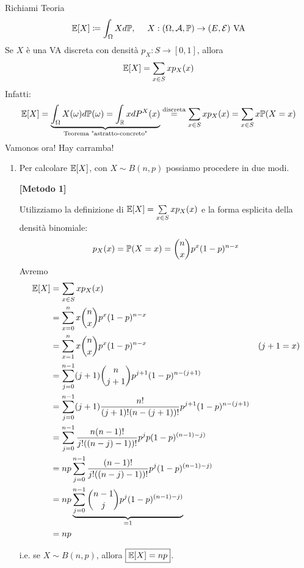 Richiami Teoria
\begin{equation*}
\mathbb{E}[ X] \coloneqq \int _{\Omega } Xd\mathbb{P} ,\ \ \ \ X:( \Omega ,\mathcal{A} ,\mathbb{P})\rightarrow ( E,\mathcal{E}) \ \text{VA}
\end{equation*}
Se $X$ è una VA discreta con densità $p_{X} :S\rightarrow [ 0,1]$, allora
\begin{equation*}
\mathbb{E}[ X] =\sum\limits _{x\in S} xp_{X}( x)
\end{equation*}
Infatti:
\begin{equation*}
\mathbb{E}[ X] =\underbrace{\int _{\Omega } X( \omega ) d\mathbb{P}( \omega ) =\int _{\mathbb{R}} xdP^{X}( x)}_{\text{Teorema "astratto-concreto"}}\overset{\text{discreta}}{=}\sum\limits _{x\in S} xp_{X}( x) =\sum\limits _{x\in S} x\mathbb{P}( X=x)
\end{equation*}
Vamonos ora! Hay carramba!
\begin{enumerate}
\item Per calcolare $\mathbb{E}[ X]$, con $X\sim B( n,p)$ possiamo procedere in due modi.

\textbf{[Metodo 1]}

Utilizziamo la definizione di $\mathbb{E}[ X] =\sum\limits _{x\in S} xp_{X}( x)$ e la forma esplicita della densità binomiale:\begin{equation*}
p_{X}( x) =\mathbb{P}( X=x) =\binom{n}{x} p^{x}( 1-p)^{n-x}
\end{equation*}
Avremo
\begin{align*}
\mathbb{E}[ X] & =\sum\limits _{x\in S} xp_{X}( x) & \\
 & =\sum\limits _{x=0}^{n} x\binom{n}{x} p^{x}( 1-p)^{n-x} & \\
 & =\sum\limits _{x=1}^{n} x\binom{n}{x} p^{x}( 1-p)^{n-x} & ( j+1=x)\\
 & =\sum\limits _{j=0}^{n-1}( j+1)\binom{n}{j+1} p^{j+1}( 1-p)^{n-( j+1)} & \\
 & =\sum\limits _{j=0}^{n-1}( j+1)\frac{n!}{( j+1) !( n-( j+1)) !} p^{j+1}( 1-p)^{n-( j+1)} & \\
 & =\sum\limits _{j=0}^{n-1}\frac{n( n-1) !}{j!(( n-j) -1)) !} p^{j} p( 1-p)^{( n-1) -j)} & \\
 & =np\sum\limits _{j=0}^{n-1}\frac{( n-1) !}{j!(( n-j) -1)) !} p^{j}( 1-p)^{( n-1) -j)} & \\
 & =np\underbrace{\sum\limits _{j=0}^{n-1}\binom{n-1}{j} p^{j}( 1-p)^{( n-1) -j)}}_{=1} & \\
 & =np & 
\end{align*}

i.e. se $X\sim B( n,p)$, allora $\boxed{\mathbb{E}[ X] =np}$.


\end{enumerate}
